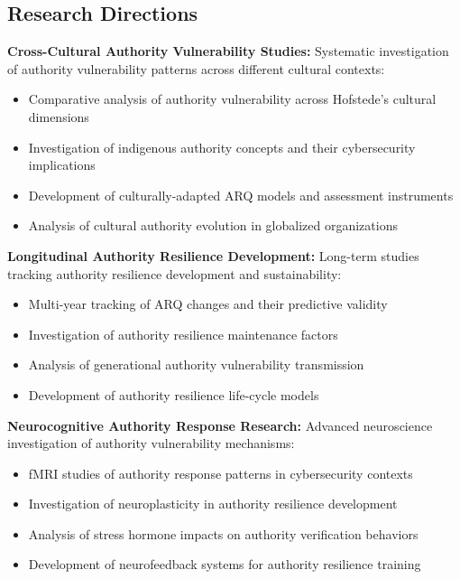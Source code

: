 \documentclass[11pt,a4paper]{article}
\begin{document}
\subsection{Research Directions}

\textbf{Cross-Cultural Authority Vulnerability Studies:}
Systematic investigation of authority vulnerability patterns across different cultural contexts:

\begin{itemize}
\item Comparative analysis of authority vulnerability across Hofstede's cultural dimensions
\item Investigation of indigenous authority concepts and their cybersecurity implications
\item Development of culturally-adapted ARQ models and assessment instruments
\item Analysis of cultural authority evolution in globalized organizations
\end{itemize}

\textbf{Longitudinal Authority Resilience Development:}
Long-term studies tracking authority resilience development and sustainability:

\begin{itemize}
\item Multi-year tracking of ARQ changes and their predictive validity
\item Investigation of authority resilience maintenance factors
\item Analysis of generational authority vulnerability transmission
\item Development of authority resilience life-cycle models
\end{itemize}

\textbf{Neurocognitive Authority Response Research:}
Advanced neuroscience investigation of authority vulnerability mechanisms:

\begin{itemize}
\item fMRI studies of authority response patterns in cybersecurity contexts
\item Investigation of neuroplasticity in authority resilience development
\item Analysis of stress hormone impacts on authority verification behaviors
\item Development of neurofeedback systems for authority resilience training
\end{itemize}
\end{document}
